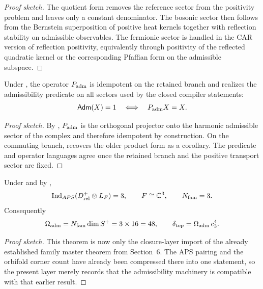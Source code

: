 \begin{proof}[Proof sketch]
The quotient form  removes the reference sector from the positivity problem and leaves only a constant denominator. The bosonic sector then follows from the Bernstein superposition of positive heat kernels together with reflection stability on admissible observables. The fermionic sector is handled in the CAR version of reflection positivity, equivalently through positivity of the reflected quadratic kernel or the corresponding Pfaffian form on the admissible subspace.
\end{proof}

\begin{theorem}
Under , the operator $P_{\mathrm{adm}}$ is idempotent on the retained branch and realizes the admissibility predicate on all sectors used by the closed compiler statements:
\[
\mathsf{Adm}(X)=1
\quad\Longleftrightarrow\quad
P_{\mathrm{adm}} X = X.
\]
\end{theorem}

\begin{proof}[Proof sketch]
By , $P_{\mathrm{adm}}$ is the orthogonal projector onto the harmonic admissible sector of the complex and therefore idempotent by construction. On the commuting branch,  recovers the older product form as a corollary. The predicate and operator languages agree once the retained branch and the positive transport sector are fixed.
\end{proof}

\begin{theorem}
Under  and by ,
\[
\operatorname{Ind}_{APS}(D^+_{\mathrm{rel}}\otimes L_F)=3,
\qquad
F\cong\mathbb C^3,
\qquad
N_{\mathrm{fam}}=3.
\]
Consequently
\[
\Omega_{\mathrm{adm}}=N_{\mathrm{fam}}\dim S^+=3\times 16=48,
\qquad
\delta_{\mathrm{top}}=\Omega_{\mathrm{adm}}\,c_3^4.
\]
\end{theorem}

\begin{proof}[Proof sketch]
This theorem is now only the closure-layer import of the already established family master theorem from Section~6. The APS pairing and the orbifold corner count have already been compressed there into one statement, so the present layer merely records that the admissibility machinery is compatible with that earlier result.
\end{proof}

